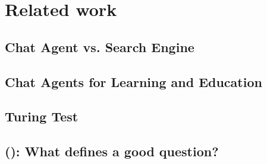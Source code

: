 \chapter{Related work}
\label{chapter3:related_work}

\section{Chat Agent vs. Search Engine}
\label{chapter3:chatbot_vs_search_engine}


\section{Chat Agents for Learning and Education}
\label{chapter3:learning_with_chatbots}


\section{Turing Test}
\label{chapter3:turing_test}


\section{ (): What defines a good question?}
\label{chapter3:define_good_question}

